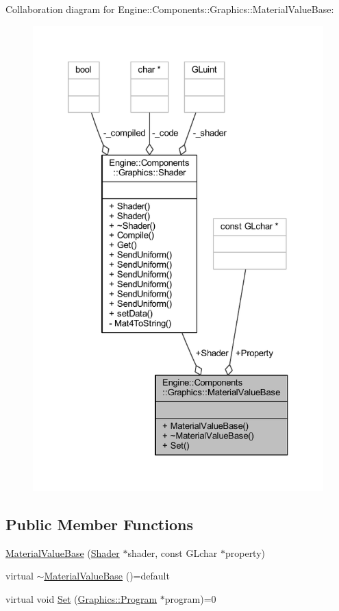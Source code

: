 Collaboration diagram for Engine\+:\+:Components\+:\+:Graphics\+:\+:Material\+Value\+Base\+:
\nopagebreak
\begin{figure}[H]
\begin{center}
\leavevmode
\includegraphics[width=327pt]{classEngine_1_1Components_1_1Graphics_1_1MaterialValueBase__coll__graph}
\end{center}
\end{figure}
\subsection*{Public Member Functions}
\begin{DoxyCompactItemize}
\item 
\mbox{\hyperlink{classEngine_1_1Components_1_1Graphics_1_1MaterialValueBase_aec4518ee9e8635ab6639609c92d0f89d}{Material\+Value\+Base}} (\mbox{\hyperlink{classEngine_1_1Components_1_1Graphics_1_1Shader}{Shader}} $\ast$shader, const G\+Lchar $\ast$property)
\item 
virtual \mbox{\hyperlink{classEngine_1_1Components_1_1Graphics_1_1MaterialValueBase_a41a10de25ed9c82203560e83b89c250d}{$\sim$\+Material\+Value\+Base}} ()=default
\item 
virtual void \mbox{\hyperlink{classEngine_1_1Components_1_1Graphics_1_1MaterialValueBase_abc2e449e9067701c927fca5962391afb}{Set}} (\mbox{\hyperlink{classEngine_1_1Components_1_1Graphics_1_1Program}{Graphics\+::\+Program}} $\ast$program)=0
\end{DoxyCompactItemize}

